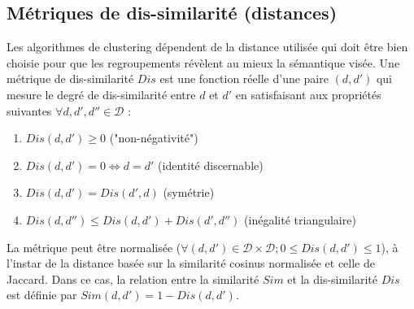 

\subsection{Métriques de dis-similarité (distances)}
\label{sec:similarite:distances}
Les algorithmes de clustering dépendent de la distance utilisée qui doit être bien choisie pour que les regroupements révèlent au mieux la sémantique visée.
 Une métrique de dis-similarité $Dis$ est une fonction réelle d'une paire $(d,d')$ qui mesure le degré de dis-similarité entre $d$ et $d'$  en satisfaisant aux propriétés suivantes $\forall d,d',d'' \in \mathcal{D}$ \citep{wang2015distancemetriclearningsurvey}:
\begin{enumerate}
\item $Dis(d,d') \geq 0$ ("non-négativité")
\item $Dis(d,d') = 0  \Leftrightarrow d = d'$ (identité discernable)
\item $Dis(d,d') = Dis(d', d)$ (symétrie)
\item $Dis(d,d'') \leq Dis(d,d') + Dis(d',d'')$ (inégalité triangulaire) \label{enum:sim:ineq-tri}
\end{enumerate}


La métrique peut être normalisée ($\forall (d,d') \in \mathcal{D} \times \mathcal{D};  0 \leq Dis(d,d') \leq 1$), à l'instar de la distance basée sur la similarité cosinus normalisée et celle de Jaccard. Dans ce cas, la relation entre la similarité $Sim$ et la dis-similarité $Dis$ est définie par $Sim(d,d') = 1 - Dis(d,d')$.

